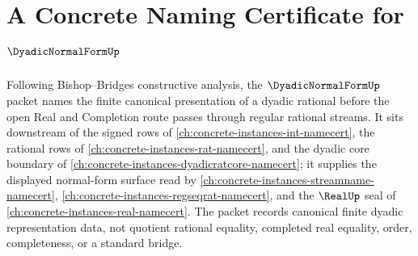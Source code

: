 \chapter{A Concrete Naming Certificate for $\DyadicNormalFormUp$}
\label{ch:concrete-instances-dyadic-normal-form-namecert}

Following Bishop--Bridges constructive analysis, the $\DyadicNormalFormUp$ packet names the finite canonical presentation of a dyadic rational before the open Real and Completion route passes through regular rational streams. It sits downstream of the signed rows of \autoref{ch:concrete-instances-int-namecert}, the rational rows of \autoref{ch:concrete-instances-rat-namecert}, and the dyadic core boundary of \autoref{ch:concrete-instances-dyadicratcore-namecert}; it supplies the displayed normal-form surface read by \autoref{ch:concrete-instances-streamname-namecert}, \autoref{ch:concrete-instances-regseqrat-namecert}, and the $\RealUp$ seal of \autoref{ch:concrete-instances-real-namecert}. The packet records canonical finite dyadic representation data, not quotient rational equality, completed real equality, order, completeness, or a standard bridge.

